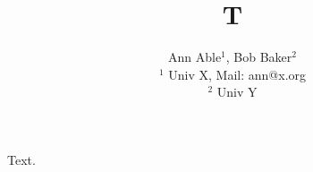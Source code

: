 \documentclass{article}
\begin{document}
\title{T}
\author{Ann Able$^1$, Bob Baker$^2$ \\
$^1$ Univ X, Mail: ann@x.org \\
$^2$ Univ Y}
\maketitle
Text.
\end{document}
